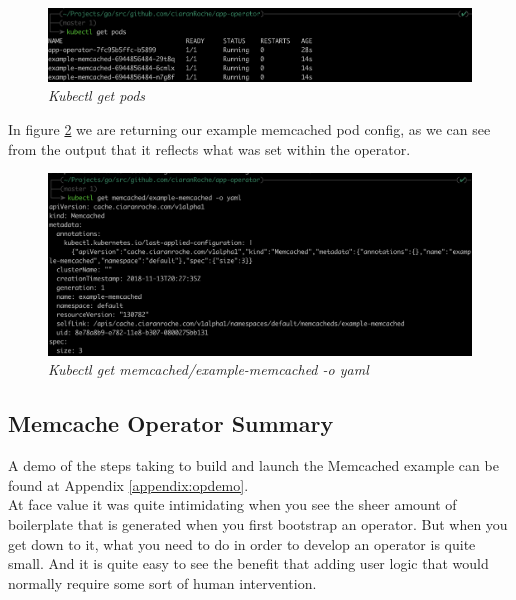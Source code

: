 \begin{figure}[!ht]
\centering
\includegraphics*[width=1\textwidth]{images/con8.png}
\caption{\em Kubectl get pods}
\label{img:con8}
\end{figure}

In figure \ref{img:con9} we are returning our example memcached pod config, as we can see from the output that it reflects what was set within the operator.
\begin{figure}[!ht]
\centering
\includegraphics*[width=1\textwidth]{images/con9.png}
\caption{\em Kubectl get memcached/example-memcached -o yaml}
\label{img:con9}
\end{figure}

\subsection{Memcache Operator Summary}
A demo of the steps taking to build and launch the Memcached example can be found at Appendix \ref{appendix:opdemo}. 
\\
At face value it was quite intimidating when you see the sheer amount of boilerplate that is generated when you first bootstrap an operator. But when you get down to it, what you need to do in order to develop an operator is quite small. And it is quite easy to see the benefit that adding user logic that would normally require some sort of human intervention.

